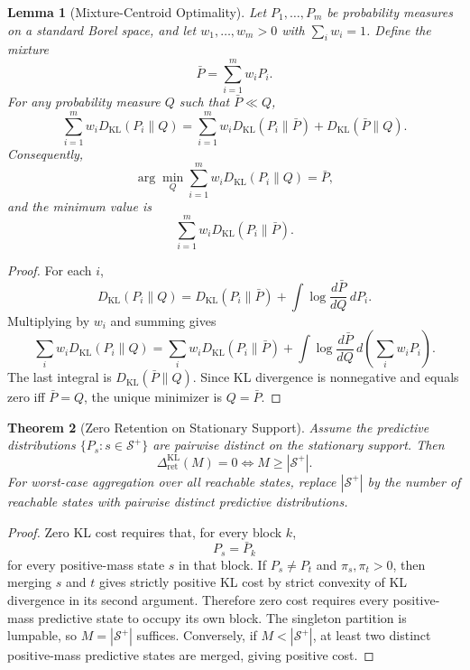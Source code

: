 \documentclass[12pt]{article}
\newtheorem{theorem}{Theorem}[section]
\newtheorem{lemma}[theorem]{Lemma}
\theoremstyle{definition}
\newcommand{\RetKL}{\Delta_{\mathrm{ret}}^{\mathrm{KL}}}
\newcommand{\Splus}{\mathcal S^{+}}
\begin{document}
\begin{lemma}[Mixture-Centroid Optimality]
\label{lem:mixture-centroid}
Let $P_1,\dots,P_m$ be probability measures on a standard Borel space, and let
$w_1,\dots,w_m>0$ with $\sum_i w_i=1$.  Define the mixture
\[
\bar P=\sum_{i=1}^m w_i P_i.
\]
For any probability measure $Q$ such that $\bar P\ll Q$,
\[
\sum_{i=1}^m w_i D_{\mathrm{KL}}(P_i\|Q)
=
\sum_{i=1}^m w_i D_{\mathrm{KL}}(P_i\|\bar P)
+
D_{\mathrm{KL}}(\bar P\|Q).
\]
Consequently,
\[
\arg\min_Q
\sum_{i=1}^m w_i D_{\mathrm{KL}}(P_i\|Q)
=
\bar P,
\]
and the minimum value is
\[
\sum_{i=1}^m w_i D_{\mathrm{KL}}(P_i\|\bar P).
\]
\end{lemma}

\begin{proof}
For each $i$,
\[
D_{\mathrm{KL}}(P_i\|Q)
=
D_{\mathrm{KL}}(P_i\|\bar P)
+
\int
\log\frac{d\bar P}{dQ}\,dP_i.
\]
Multiplying by $w_i$ and summing gives
\[
\sum_i w_i D_{\mathrm{KL}}(P_i\|Q)
=
\sum_i w_i D_{\mathrm{KL}}(P_i\|\bar P)
+
\int
\log\frac{d\bar P}{dQ}
\,d\!\left(\sum_i w_i P_i\right).
\]
The last integral is $D_{\mathrm{KL}}(\bar P\|Q)$.  Since KL divergence is
nonnegative and equals zero iff $\bar P=Q$, the unique minimizer is
$Q=\bar P$.
\end{proof}

\begin{theorem}[Zero Retention on Stationary Support]
\label{thm:retention-zero}
Assume the predictive distributions $\{P_s:s\in\Splus\}$ are pairwise distinct
on the stationary support.  Then
\[
\RetKL(M)=0
\iff
M\ge |\Splus|.
\]
For worst-case aggregation over all reachable states, replace $|\Splus|$ by
the number of reachable states with pairwise distinct predictive
distributions.
\end{theorem}

\begin{proof}
Zero KL cost requires that, for every block $k$,
\[
P_s=\bar P_k
\]
for every positive-mass state $s$ in that block.  If $P_s\neq P_t$ and
$\pi_s,\pi_t>0$, then merging $s$ and $t$ gives strictly positive KL cost by
strict convexity of KL divergence in its second argument.
Therefore zero cost requires every positive-mass predictive state to occupy
its own block.  The singleton partition is lumpable, so $M=|\Splus|$
suffices.  Conversely, if $M<|\Splus|$, at least two distinct positive-mass
predictive states are merged, giving positive cost.
\end{proof}
\end{document}
